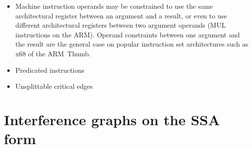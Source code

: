 \begin{itemize}
\item Machine instruction operands may be constrained to use the same
architectural register between an argument and a result, or even to use
different architectural registers between two argument operands (MUL
instructions on the ARM). Operand constraints between one argument and the
result are the general case on popular instruction set architectures such as
\textsf{x68} of the \textsf{ARM~Thumb}.

\item Predicated instructions

\item Unsplittable critical edges

\end{itemize}


\section{Interference graphs on the SSA form}



